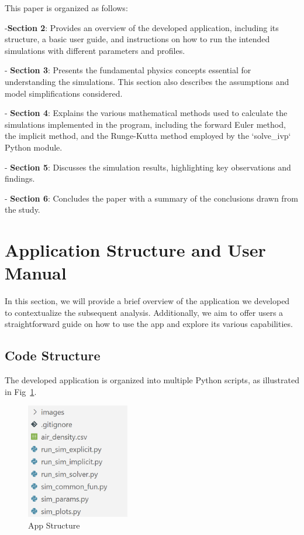 \documentclass[runningheads]{llncs}
\begin{document}
This paper is organized as follows:

-\textbf{Section 2}: Provides an overview of the developed application, including its structure, a basic user guide, and instructions on how to run the intended simulations with different parameters and profiles.

- \textbf{Section 3}: Presents the fundamental physics concepts essential for understanding the simulations. This section also describes the assumptions and model simplifications considered.

- \textbf{Section 4}: Explains the various mathematical methods used to calculate the simulations implemented in the program, including the forward Euler method, the implicit method, and the Runge-Kutta method employed by the `solve\_ivp` Python module.

- \textbf{Section 5}: Discusses the simulation results, highlighting key observations and findings.

- \textbf{Section 6}: Concludes the paper with a summary of the conclusions drawn from the study.




\section{Application Structure and User Manual}
In this section, we will provide a brief overview of the application we developed to contextualize the subsequent analysis. Additionally, we aim to offer users a straightforward guide on how to use the app and explore its various capabilities.

\subsection{Code Structure}
The developed application \cite{git} is organized into multiple Python scripts, as illustrated in Fig~\ref{app_structure}.

\begin{figure}
\centering
\includegraphics[width=0.4\textwidth]{images/app_structure.png}
\caption{App Structure \cite{git}} \label{app_structure}
\end{figure}
\end{document}
